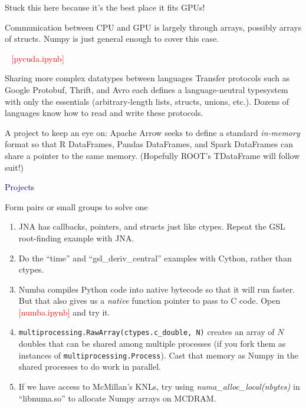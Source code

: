 \documentclass{beamer}
\begin{document}
\begin{frame}{Stuck this here because it's the best place it fits}
\vspace{0.5 cm}
{\LARGE GPUs!}

\vspace{0.5 cm}
Communication between CPU and GPU is largely through arrays, possibly arrays of structs. Numpy is just general enough to cover this case.

\vspace{0.5 cm}
\mbox{ } \hfill \textcolor{red}{[pycuda.ipynb]} \hfill \mbox{ }
\end{frame}

\begin{frame}{Sharing more complex datatypes between languages}
Transfer protocols such as Google Protobuf, Thrift, and Avro each defines a language-neutral typesystem with only the essentials (arbitrary-length lists, structs, unions, etc.). Dozens of languages know how to read and write these protocols.

\vfill
A project to keep an eye on: Apache Arrow seeks to define a standard {\it in-memory} format so that R DataFrames, Pandas DataFrames, and Spark DataFrames can share a pointer to the same memory. (Hopefully ROOT's TDataFrame will follow suit!)
\end{frame}

\begin{frame}{}
\begin{center}
\textcolor{darkblue}{\LARGE Projects}
\end{center}
\end{frame}

\begin{frame}{Form pairs or small groups to solve one}
\vspace{0.3 cm}
\begin{enumerate}\setlength{\itemsep}{0.2 cm}
\item JNA has callbacks, pointers, and structs just like ctypes. Repeat the GSL root-finding example with JNA.
\item Do the ``time'' and ``gsl\_deriv\_central'' examples with Cython, rather than ctypes.
\item Numba compiles Python code into native bytecode so that it will run faster. But that also gives us a {\it native} function pointer to pass to C code. Open \textcolor{red}{[numba.ipynb]} and try it.
\item {\tt\small multiprocessing.RawArray(ctypes.c\_double, N)} creates an array of $N$ doubles that can be shared among multiple processes (if you fork them as instances of {\tt\small multiprocessing.Process}). Cast that memory as Numpy in the shared processes to do work in parallel.
\item If we have access to McMillan's KNLs, try using {\it numa\_alloc\_local(nbytes)} in ``libnuma.so'' to allocate Numpy arrays on MCDRAM.
\end{enumerate}
\end{frame}
\end{document}

